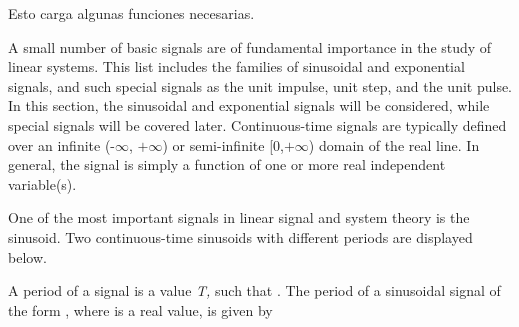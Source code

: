 \documentclass{article}
\begin{document}
Esto carga algunas funciones necesarias.

\begin{CellGroup}


A small number of basic signals are of fundamental importance in the study  of linear systems. This list includes the families of sinusoidal and
 exponential signals, and such special signals as the unit impulse, unit step, and the unit pulse. In this section, the sinusoidal and exponential
signals will  be considered, while special signals will be covered later. Continuous-time  signals are typically defined over an infinite (-\(\infty
\), \(+\)\(\infty \))  or semi-infinite [0,\(+\)\(\infty \)) domain of the real line. In general, the signal is simply a function of one or more
real independent variable(s).

\begin{CellGroup}
One of the most important signals in linear signal and system theory is  the sinusoid. Two continuous-time sinusoids with different periods are displayed
below.


\end{CellGroup}
\begin{CellGroup}

\end{CellGroup}
 A period of a signal  is a value {\itshape T,} such that . The period of a sinusoidal
signal of the form , where  is a real value, is given by




\end{CellGroup}
\end{document}
